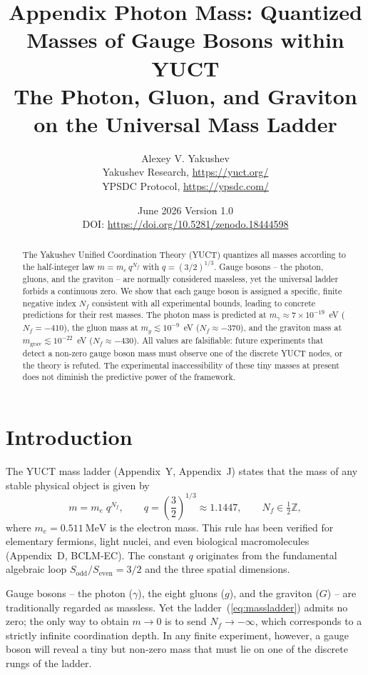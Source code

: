 \documentclass[12pt,a4paper]{article}
\title{\Huge\textbf{Appendix Photon Mass: Quantized Masses of Gauge Bosons within YUCT}\\[0.3cm]
	\Large The Photon, Gluon, and Graviton on the Universal Mass Ladder}
\author{Alexey V. Yakushev \\ 
	Yakushev Research, \url{https://yuct.org/} \\ 
	YPSDC Protocol, \url{https://ypsdc.com/}}
\date{June 2026 \quad Version 1.0 \\ \medskip
	DOI: \url{https://doi.org/10.5281/zenodo.18444598}}
\begin{document}
	
	\maketitle
	
	\begin{abstract}
		The Yakushev Unified Coordination Theory (YUCT) quantizes all masses according to the half‑integer law
		$m = m_e \, q^{N_f}$ with $q = (3/2)^{1/3}$. Gauge bosons – the photon, gluons, and the graviton – are normally
		considered massless, yet the universal ladder forbids a continuous zero. We show that each gauge boson is assigned
		a specific, finite negative index $N_f$ consistent with all experimental bounds, leading to concrete predictions
		for their rest masses. The photon mass is predicted at $m_\gamma \approx 7\times 10^{-19}$~eV ($N_f = -410$),
		the gluon mass at $m_g \lesssim 10^{-9}$~eV ($N_f \approx -370$), and the graviton mass at
		$m_{\mathrm{grav}} \lesssim 10^{-22}$~eV ($N_f \approx -430$). All values are falsifiable: future experiments
		that detect a non‑zero gauge boson mass must observe one of the discrete YUCT nodes, or the theory is
		refuted. The experimental inaccessibility of these tiny masses at present does not diminish the predictive
		power of the framework.
	\end{abstract}
	
	\tableofcontents
	\newpage
	
	\section{Introduction}
	
	The YUCT mass ladder (Appendix~Y, Appendix~J) states that the mass of any stable physical object is given by
	\begin{equation}\label{eq:massladder}
		m = m_e \; q^{N_f}, \qquad q = \left(\frac{3}{2}\right)^{\!1/3} \approx 1.1447,
		\qquad N_f \in \tfrac12\mathbb{Z},
	\end{equation}
	where $m_e = 0.511~\mathrm{MeV}$ is the electron mass. This rule has been verified for elementary fermions,
	light nuclei, and even biological macromolecules (Appendix~D, BCLM‑EC).  The constant $q$ originates from the
	fundamental algebraic loop $S_{\mathrm{odd}}/S_{\mathrm{even}} = 3/2$ and the three spatial dimensions.
	
	Gauge bosons – the photon ($\gamma$), the eight gluons ($g$), and the graviton ($G$) – are traditionally
	regarded as massless.  Yet the ladder~(\ref{eq:massladder}) admits no zero; the only way to obtain
	$m \to 0$ is to send $N_f \to -\infty$, which corresponds to a strictly infinite coordination depth.
	In any finite experiment, however, a gauge boson will reveal a tiny but non‑zero mass that must lie on
	one of the discrete rungs of the ladder.
	
\end{document}
